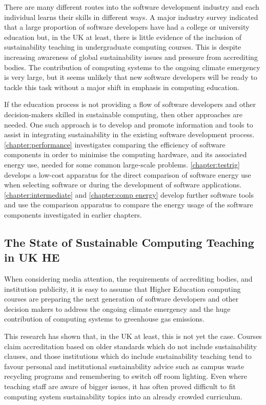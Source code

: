 There are many different routes into the software development industry and each individual learns their skills in different ways. A major industry survey indicated that a large proportion of software developers have had a college or university education but, in the UK at least, there is little evidence of the inclusion of sustainability teaching in undergraduate computing courses. This is despite increasing awareness of global sustainability issues and pressure from accrediting bodies. The contribution of computing systems to the ongoing climate emergency is very large, but it seems unlikely that new software developers will be ready to tackle this task without a major shift in emphasis in computing education.

If the education process is not providing a flow of software developers and other decision-makers skilled in sustainable computing, then other approaches are needed. One such approach is to develop and promote information and tools to assist in integrating sustainability in the existing software development process. \autoref{chapter:performance} investigates comparing the efficiency of software components in order to minimise the computing hardware, and its associated energy use, needed for some common large-scale problems. \autoref{chapter:testrig} develops a low-cost apparatus for the direct comparison of software energy use when selecting software or during the development of software applications. \autoref{chapter:intermediate} and \autoref{chapter:comp energy} develop further software tools and use the comparison apparatus to compare the energy usage of the software components investigated in earlier chapters.

\subsection*{The State of Sustainable Computing Teaching in UK HE}
\label{contrib:HE}

When considering media attention, the requirements of accrediting bodies, and institution publicity, it is easy to assume that Higher Education computing courses are preparing the next generation of software developers and other decision makers to address the ongoing climate emergency and the huge contribution of computing systems to greenhouse gas emissions.

This research has shown that, in the UK at least, this is not yet the case. Courses claim accreditation based on older standards which do not include sustainability clauses, and those institutions which do include sustainability teaching tend to favour personal and institutional sustainability advice such as campus waste recycling programs and remembering to switch off room lighting. Even where teaching staff are aware of bigger issues, it has often proved difficult to fit computing system sustainability topics into an already crowded curriculum.

